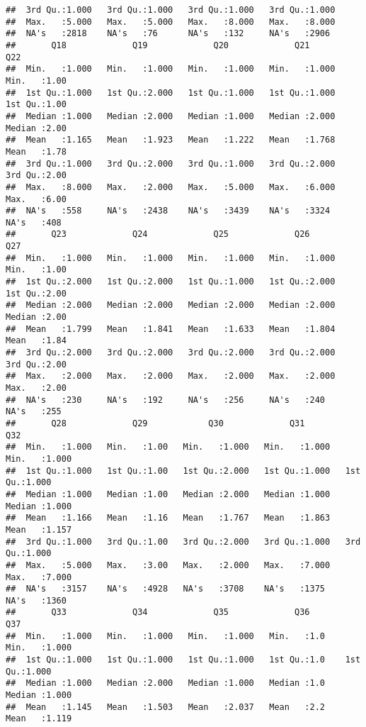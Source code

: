 \documentclass[
]{article}
\begin{document}
\begin{verbatim}
##  3rd Qu.:1.000   3rd Qu.:1.000   3rd Qu.:1.000   3rd Qu.:1.000  
##  Max.   :5.000   Max.   :5.000   Max.   :8.000   Max.   :8.000  
##  NA's   :2818    NA's   :76      NA's   :132     NA's   :2906   
##       Q18             Q19             Q20             Q21             Q22      
##  Min.   :1.000   Min.   :1.000   Min.   :1.000   Min.   :1.000   Min.   :1.00  
##  1st Qu.:1.000   1st Qu.:2.000   1st Qu.:1.000   1st Qu.:1.000   1st Qu.:1.00  
##  Median :1.000   Median :2.000   Median :1.000   Median :2.000   Median :2.00  
##  Mean   :1.165   Mean   :1.923   Mean   :1.222   Mean   :1.768   Mean   :1.78  
##  3rd Qu.:1.000   3rd Qu.:2.000   3rd Qu.:1.000   3rd Qu.:2.000   3rd Qu.:2.00  
##  Max.   :8.000   Max.   :2.000   Max.   :5.000   Max.   :6.000   Max.   :6.00  
##  NA's   :558     NA's   :2438    NA's   :3439    NA's   :3324    NA's   :408   
##       Q23             Q24             Q25             Q26             Q27      
##  Min.   :1.000   Min.   :1.000   Min.   :1.000   Min.   :1.000   Min.   :1.00  
##  1st Qu.:2.000   1st Qu.:2.000   1st Qu.:1.000   1st Qu.:2.000   1st Qu.:2.00  
##  Median :2.000   Median :2.000   Median :2.000   Median :2.000   Median :2.00  
##  Mean   :1.799   Mean   :1.841   Mean   :1.633   Mean   :1.804   Mean   :1.84  
##  3rd Qu.:2.000   3rd Qu.:2.000   3rd Qu.:2.000   3rd Qu.:2.000   3rd Qu.:2.00  
##  Max.   :2.000   Max.   :2.000   Max.   :2.000   Max.   :2.000   Max.   :2.00  
##  NA's   :230     NA's   :192     NA's   :256     NA's   :240     NA's   :255   
##       Q28             Q29            Q30             Q31             Q32       
##  Min.   :1.000   Min.   :1.00   Min.   :1.000   Min.   :1.000   Min.   :1.000  
##  1st Qu.:1.000   1st Qu.:1.00   1st Qu.:2.000   1st Qu.:1.000   1st Qu.:1.000  
##  Median :1.000   Median :1.00   Median :2.000   Median :1.000   Median :1.000  
##  Mean   :1.166   Mean   :1.16   Mean   :1.767   Mean   :1.863   Mean   :1.157  
##  3rd Qu.:1.000   3rd Qu.:1.00   3rd Qu.:2.000   3rd Qu.:1.000   3rd Qu.:1.000  
##  Max.   :5.000   Max.   :3.00   Max.   :2.000   Max.   :7.000   Max.   :7.000  
##  NA's   :3157    NA's   :4928   NA's   :3708    NA's   :1375    NA's   :1360   
##       Q33             Q34             Q35             Q36            Q37       
##  Min.   :1.000   Min.   :1.000   Min.   :1.000   Min.   :1.0    Min.   :1.000  
##  1st Qu.:1.000   1st Qu.:1.000   1st Qu.:1.000   1st Qu.:1.0    1st Qu.:1.000  
##  Median :1.000   Median :2.000   Median :1.000   Median :1.0    Median :1.000  
##  Mean   :1.145   Mean   :1.503   Mean   :2.037   Mean   :2.2    Mean   :1.119  

\end{verbatim}
\end{document}
